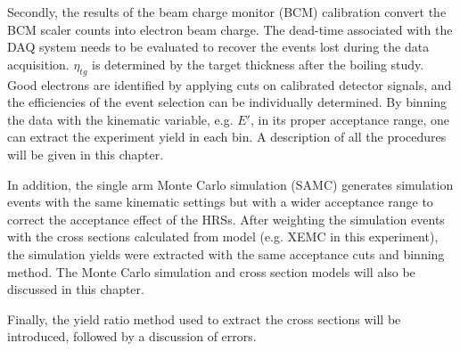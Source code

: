  Secondly, the results of the beam charge monitor (BCM) calibration convert the BCM scaler counts into electron beam charge. The dead-time associated with the DAQ system needs to be evaluated to recover the events lost during the data acquisition. $\eta_{tg}$ is determined by the target thickness after the boiling study. Good electrons are identified by applying cuts on calibrated detector signals, and the efficiencies of the event selection can be individually determined. By binning the data with the kinematic variable, e.g. $E'$, in its proper acceptance range, one can extract the experiment yield in each bin. A description of all the procedures will be given in this chapter.
 
 In addition, the single arm Monte Carlo simulation (SAMC) generates simulation events with the same kinematic settings but with a wider acceptance range to correct the acceptance effect of the HRSs. After weighting the simulation events with the cross sections calculated from model (e.g. XEMC in this experiment), the simulation yields were extracted with the same acceptance cuts and binning method. The Monte Carlo simulation and cross section models will also be discussed in this chapter.

 Finally, the yield ratio method used to extract the cross sections will be introduced, followed by a discussion of errors.












